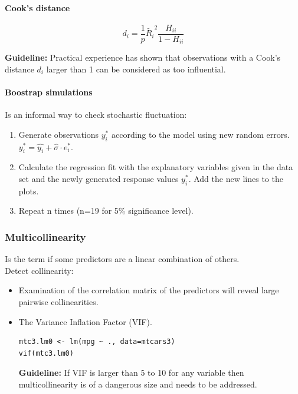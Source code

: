 \paragraph{Cook's distance}

\begin{equation*}
d_i = \frac{1}{p}\tilde{R_i}^2\frac{H_{ii}}{1-H_{ii}}
\end{equation*}

\textbf{Guideline:} Practical experience has shown that observations with a Cook’s distance $d_i$ larger than 1 can be considered as too influential.

\paragraph{Boostrap simulations}
Is an informal way to check stochastic fluctuation:
\begin{enumerate}
	\tightlist
	\item Generate observations $y_i^*$ according to the model using new random errors.\\
	$y_i^*=\hat{y_i}+\hat{\sigma}\cdot e_i^*$.
	\item Calculate the regression fit with the explanatory variables given in the data set and the newly generated response values $y_i^*$. Add the new lines to the plots.
	\item Repeat n times (n=19 for 5\% significance level).
\end{enumerate}

\subsubsection{Multicollinearity}
Is the term if some predictors are a linear combination of others.\\
Detect collinearity:
\begin{itemize}
	\tightlist
	\item Examination of the correlation matrix of the predictors will reveal large pairwise collinearities.
	\item The Variance Inflation Factor (VIF).\\
	\begin{lstlisting}
mtc3.lm0 <- lm(mpg ~ ., data=mtcars3)
vif(mtc3.lm0)
	\end{lstlisting}
	\textbf{Guideline:} If VIF is larger than 5 to 10 for any variable then multicollinearity is of a dangerous size and needs to be addressed.
\end{itemize}

